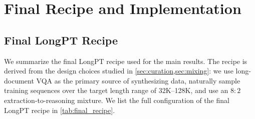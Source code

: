 \section{Final Recipe and Implementation}
\label{app:final_recipe_and_implem}
\subsection{Final LongPT Recipe}
\label{app:final_recipe}
We summarize the final LongPT recipe used for the main results.
The recipe is derived from the design choices studied in \cref{sec:curation,sec:mixing}: we use long-document VQA as the primary source of synthesizing data, naturally sample training sequences over the target length range of 32K--128K, and use an $8:2$ extraction-to-reasoning mixture. We list the full configuration of the final LongPT recipe in \cref{tab:final_recipe}.

